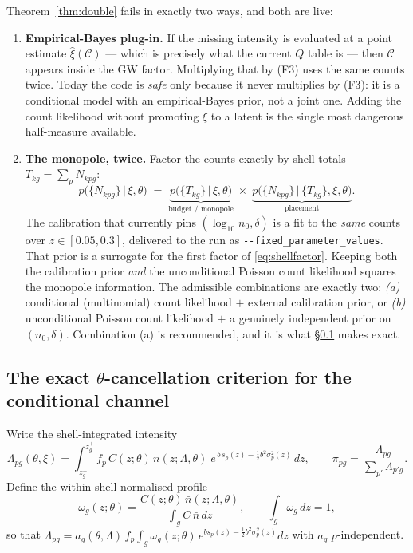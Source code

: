 \begin{remark}
\label{rem:doublebreak}
Theorem~\ref{thm:double} fails in exactly two ways, and both are live:
\begin{enumerate}
\item \textbf{Empirical-Bayes plug-in.}  If the missing intensity is evaluated
at a point estimate $\hat\xi(\mathcal C)$ --- which is precisely what the
current $Q$ table is --- then $\mathcal C$ appears inside the GW factor.
Multiplying that by (F3) uses the same counts twice.  Today the code is
\emph{safe} only because it never multiplies by (F3): it is a conditional model
with an empirical-Bayes prior, not a joint one.  Adding the count likelihood
without promoting $\xi$ to a latent is the single most dangerous half-measure
available.
\item \textbf{The monopole, twice.}  Factor the counts exactly by shell totals
$T_{kg}=\sum_pN_{kpg}$:
\begin{equation}
  p\big(\{N_{kpg}\}\,\big|\,\xi,\theta\big)
  \;=\;
  \underbrace{p\big(\{T_{kg}\}\,\big|\,\xi,\theta\big)}_{\text{budget / monopole}}
  \;\times\;
  \underbrace{p\big(\{N_{kpg}\}\,\big|\,\{T_{kg}\},\xi,\theta\big)}_{\text{placement}} .
  \label{eq:shellfactor}
\end{equation}
The calibration that currently pins $(\log_{10}n_0,\delta)$ is a fit to the
\emph{same} counts over $z\in[0.05,0.3]$, delivered to the run as
\verb|--fixed_parameter_values|.  That prior is a surrogate for the first
factor of \eqref{eq:shellfactor}.  Keeping both the calibration prior
\emph{and} the unconditional Poisson count likelihood squares the monopole
information.  The admissible combinations are exactly two:
\emph{(a)} conditional (multinomial) count likelihood $+$ external calibration
prior, or \emph{(b)} unconditional Poisson count likelihood $+$ a genuinely
independent prior on $(n_0,\delta)$.  Combination (a) is recommended, and it is
what \S\ref{sec:cancel} makes exact.
\end{enumerate}
\end{remark}

\subsection{The exact $\theta$-cancellation criterion for the conditional channel}
\label{sec:cancel}

Write the shell-integrated intensity
\begin{equation}
  \Lambda_{pg}(\theta,\xi)=\int_{z_g^-}^{z_g^+}\!
  f_p\,C(z;\theta)\,\bar n(z;\Lambda,\theta)\;
  e^{\,b\,s_p(z)-\frac12 b^2\sigma_p^2(z)}\,dz ,
  \qquad
  \pi_{pg}=\frac{\Lambda_{pg}}{\sum_{p'}\Lambda_{p'g}} .
  \label{eq:pipg}
\end{equation}
Define the within-shell normalised profile
\begin{equation}
  \omega_g(z;\theta)=\frac{C(z;\theta)\,\bar n(z;\Lambda,\theta)}
  {\int_{g} C\,\bar n\,dz},\qquad \int_g\omega_g\,dz=1,
\end{equation}
so that $\Lambda_{pg}=a_g(\theta,\Lambda)\,f_p\!\int_g\omega_g(z;\theta)\,
e^{b s_p(z)-\frac12 b^2\sigma_p^2(z)}dz$ with $a_g$ $p$-independent.

